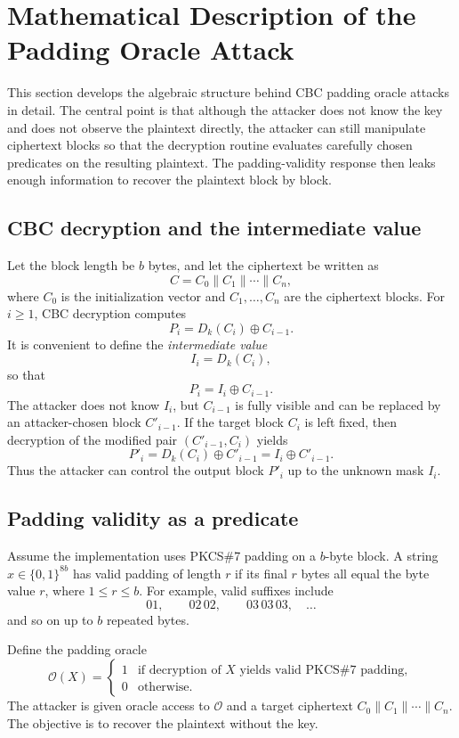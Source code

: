\section{Mathematical Description of the Padding Oracle Attack}

This section develops the algebraic structure behind CBC padding oracle attacks in detail. The central point is that although the attacker does not know the key and does not observe the plaintext directly, the attacker can still manipulate ciphertext blocks so that the decryption routine evaluates carefully chosen predicates on the resulting plaintext. The padding-validity response then leaks enough information to recover the plaintext block by block.

\subsection{CBC decryption and the intermediate value}

Let the block length be $b$ bytes, and let the ciphertext be written as
\[
C = C_0 \| C_1 \| \cdots \| C_n,
\]
where $C_0$ is the initialization vector and $C_1,\dots,C_n$ are the ciphertext blocks. For $i \ge 1$, CBC decryption computes
\[
P_i = D_k(C_i) \oplus C_{i-1}.
\]
It is convenient to define the \emph{intermediate value}
\[
I_i = D_k(C_i),
\]
so that
\[
P_i = I_i \oplus C_{i-1}.
\]
The attacker does not know $I_i$, but $C_{i-1}$ is fully visible and can be replaced by an attacker-chosen block $C'_{i-1}$. If the target block $C_i$ is left fixed, then decryption of the modified pair $(C'_{i-1}, C_i)$ yields
\[
P'_i = D_k(C_i) \oplus C'_{i-1} = I_i \oplus C'_{i-1}.
\]
Thus the attacker can control the output block $P'_i$ up to the unknown mask $I_i$.

\subsection{Padding validity as a predicate}

Assume the implementation uses PKCS\#7 padding on a $b$-byte block. A string $x \in \{0,1\}^{8b}$ has valid padding of length $r$ if its final $r$ bytes all equal the byte value $r$, where $1 \le r \le b$. For example, valid suffixes include
\[
01, \qquad 02\,02, \qquad 03\,03\,03, \quad \dots
\]
and so on up to $b$ repeated bytes.

Define the padding oracle
\[
\mathcal{O}(X) =
\begin{cases}
1 & \text{if decryption of } X \text{ yields valid PKCS\#7 padding},\\
0 & \text{otherwise.}
\end{cases}
\]
The attacker is given oracle access to $\mathcal{O}$ and a target ciphertext $C_0\|C_1\|\cdots\|C_n$. The objective is to recover the plaintext without the key.

